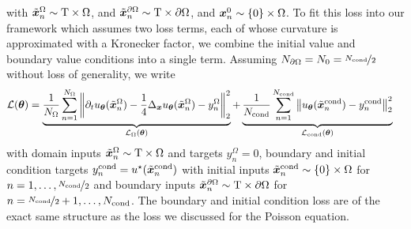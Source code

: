 with $\tilde{{\bm{x}}}_n^{\Omega} \sim \mathrm{T} \times \Omega$, and $\tilde{{\bm{x}}}_n^{\partial\Omega} \sim \mathrm{T} \times \partial\Omega$, and ${\bm{x}}_n^0 \sim \{0\} \times \Omega$.
To fit this loss into our framework which assumes two loss terms, each of whose curvature is approximated with a Kronecker factor, we combine the initial value and boundary value conditions into a single term.
Assuming $N_{\partial \Omega} = N_0 = \nicefrac{N_{\text{cond}}}{2}$ without loss of generality, we write
\begin{align*}
  {\mathcal{L}}({\bm{\theta}})
  &=
    \underbrace{
    \frac{1}{N_{\Omega}}
    \sum_{n=1}^{N_{\Omega}}
    \left\lVert
    \partial_t u_{{\bm{\theta}}}(\tilde{{\bm{x}}}_n^{\Omega})
    -
    \frac{1}{4} \Delta_{{\bm{x}}} u_{{\bm{\theta}}}(\tilde{{\bm{x}}}_n^{\Omega})
    - y_n^{\Omega}
    \right\rVert^2_2
    }_{{\mathcal{L}}_{\Omega}({\bm{\theta}})}
  +
    \underbrace{
    \frac{1}{N_{\text{cond}}}
    \sum_{n=1}^{N_{\text{cond}}}
    \left\lVert
    u_{{\bm{\theta}}}(\tilde{{\bm{x}}}_n^{\text{cond}})
    -
    y_n^{\text{cond}}
    \right\rVert^2_2
    }_{{\mathcal{L}}_{\text{cond}}({\bm{\theta}})}
\end{align*}
with domain inputs $\tilde{{\bm{x}}}_n^{\Omega} \sim \mathrm{T} \times \Omega$ and targets $y_n^{\Omega} = 0$, boundary and initial condition targets $y_n^{\text{cond}} = u^\star(\tilde{{\bm{x}}}_n^{\text{cond}})$ with initial inputs $\tilde{{\bm{x}}}_n^{\text{cond}} \sim \{0\} \times \Omega$ for $n = 1, \dots, \nicefrac{N_{\text{cond}}}{2}$ and boundary inputs $\tilde{{\bm{x}}}_n^{\partial\Omega} \sim \mathrm{T} \times \partial\Omega$ for $n = \nicefrac{N_{\text{cond}}}{2}+1, \dots, N_{\text{cond}}$.
The boundary and initial condition loss are of the exact same structure as the loss we discussed for the Poisson equation.

